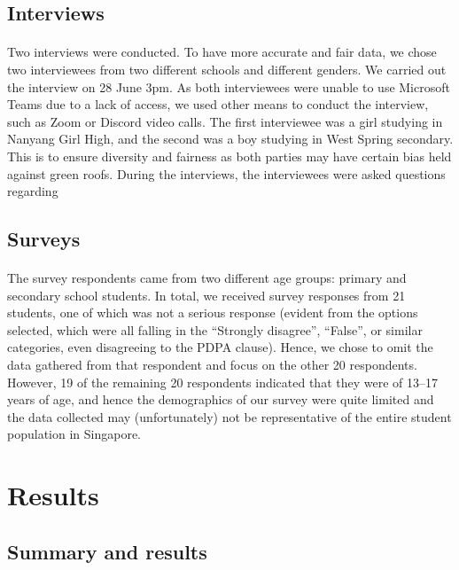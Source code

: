\documentclass{article}
\begin{document}
\begin{multicols}{2}
  \subsection{Interviews}
  \paragraph{} Two interviews were conducted. To have more accurate and
  fair data, we chose two interviewees from two different schools and
  different genders. We carried out the interview on 28 June 3pm. As
  both interviewees were unable to use Microsoft Teams due to a lack
  of access, we used other means to conduct the interview, such as Zoom
  or Discord video calls. The first interviewee was a girl studying in
  Nanyang Girl High, and the second was a boy studying in West Spring
  secondary. This is to ensure diversity and fairness as both parties
  may have certain bias held against green roofs. During the interviews,
  the interviewees were asked questions regarding

  \subsection{Surveys}
  \paragraph{} The survey respondents came from two different age groups:
  primary and secondary school students. In total, we received survey
  responses from 21 students, one of which was not a serious response
  (evident from the options selected, which were all falling in the
  ``Strongly disagree'', ``False'', or similar categories, even disagreeing
  to the PDPA clause). Hence, we chose to omit the data gathered from
  that respondent and focus on the other 20 respondents. However, 19 of
  the remaining 20 respondents indicated that they were of 13--17 years
  of age, and hence the demographics of our survey were quite limited
  and the data collected may (unfortunately) not be representative of
  the entire student population in Singapore.


  \section{Results}
  \subsection{Summary and results}


\end{multicols}
\end{document}
